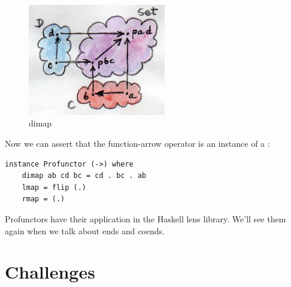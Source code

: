 \begin{figure}[H]
\centering
\includegraphics[width=60mm]{images/dimap.jpg}
\caption{dimap}
\end{figure}

\noindent
Now we can assert that the function-arrow operator is an instance of a
:

\begin{Verbatim}
instance Profunctor (->) where
    dimap ab cd bc = cd . bc . ab
    lmap = flip (.)
    rmap = (.)
\end{Verbatim}
Profunctors have their application in the Haskell lens library. We'll
see them again when we talk about ends and coends.

\section{Challenges}

